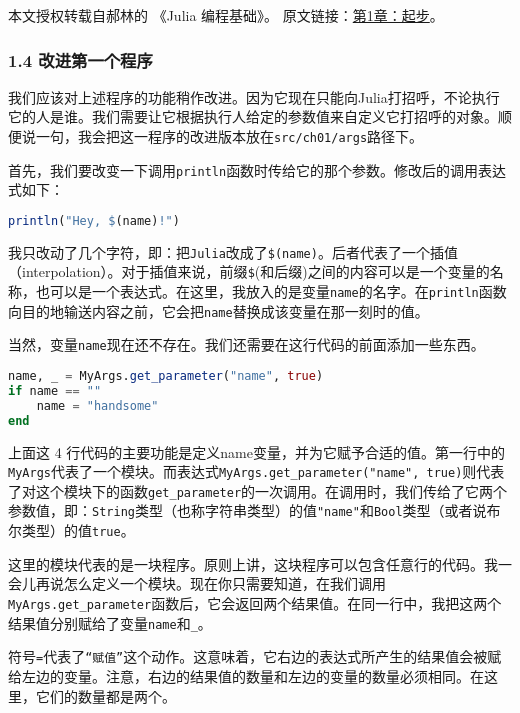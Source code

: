 
本文授权转载自郝林的 《Julia 编程基础》。 原文链接：\href{https://github.com/hyper0x/JuliaBasics/blob/master/book/ch01.md}{第1章：起步}。


\subsubsection{1.4 改进第一个程序}

我们应该对上述程序的功能稍作改进。因为它现在只能向Julia打招呼，不论执行它的人是谁。我们需要让它根据执行人给定的参数值来自定义它打招呼的对象。顺便说一句，我会把这一程序的改进版本放在\verb|src/ch01/args|路径下。

首先，我们要改变一下调用\verb|println|函数时传给它的那个参数。修改后的调用表达式如下：
\begin{lstlisting}[language=julia]
println("Hey, $(name)!")
\end{lstlisting}

我只改动了几个字符，即：把\verb|Julia|改成了\verb|$(name)|。后者代表了一个插值（interpolation）。对于插值来说，前缀\verb|$|(和后缀)之间的内容可以是一个变量的名称，也可以是一个表达式。在这里，我放入的是变量\verb|name|的名字。在\verb|println|函数向目的地输送内容之前，它会把\verb|name|替换成该变量在那一刻时的值。

当然，变量\verb|name|现在还不存在。我们还需要在这行代码的前面添加一些东西。

\begin{lstlisting}[language=julia]
name, _ = MyArgs.get_parameter("name", true)
if name == "" 
    name = "handsome" 
end
\end{lstlisting}

上面这 4 行代码的主要功能是定义name变量，并为它赋予合适的值。第一行中的\verb|MyArgs|代表了一个模块。而表达式\verb|MyArgs.get_parameter("name", true)|则代表了对这个模块下的函数\verb|get_parameter|的一次调用。在调用时，我们传给了它两个参数值，即：\verb|String|类型（也称字符串类型）的值\verb|"name"|和\verb|Bool|类型（或者说布尔类型）的值\verb|true|。

这里的模块代表的是一块程序。原则上讲，这块程序可以包含任意行的代码。我一会儿再说怎么定义一个模块。现在你只需要知道，在我们调用\verb|MyArgs.get_parameter|函数后，它会返回两个结果值。在同一行中，我把这两个结果值分别赋给了变量\verb|name|和\verb|_|。

符号\verb|=|代表了\verb|“赋值”|这个动作。这意味着，它右边的表达式所产生的结果值会被赋给左边的变量。注意，右边的结果值的数量和左边的变量的数量必须相同。在这里，它们的数量都是两个。

